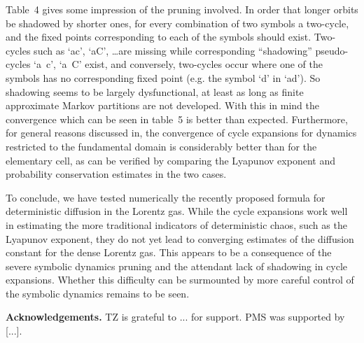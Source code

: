 \documentclass[pre,twocolumn,groupedaddress,showpacs,showkeys]{revtex4}
\begin{document}
Table~4 gives some impression of the pruning involved.
In order that longer orbits be shadowed by shorter ones,
for every combination of two symbols a two-cycle,
and the fixed points corresponding to each of the symbols should exist.
Two-cycles such as `ac', `aC', \ldots are missing while
corresponding ``shadowing'' pseudo-cycles `a~c', `a~C' exist, and
conversely, two-cycles occur where one of the symbols
has no corresponding fixed point
(e.g. the symbol `d' in `ad'). So shadowing seems to be largely dysfunctional,
at least as long as finite approximate Markov partitions are
not developed.
With this in mind the convergence which can be seen in table~5
is better than expected. Furthermore, for general reasons discussed
in, the convergence of cycle expansions for dynamics
restricted to the fundamental domain is considerably better
than for the elementary cell, as can be verified by comparing
the Lyapunov exponent and probability conservation estimates in
the two cases.


To conclude, we have tested numerically the recently proposed formula
for deterministic diffusion in the Lorentz gas.
While the cycle expansions work well in estimating
the more traditional indicators of deterministic chaos, such as
the Lyapunov exponent, they do not yet lead to converging estimates
of the diffusion constant for the dense Lorentz gas. This appears to
be a consequence of the severe symbolic dynamics pruning and the
attendant lack of shadowing in cycle expansions. Whether this difficulty
can be surmounted by more careful control of the symbolic dynamics
remains to be seen.

{\bf Acknowledgements.}
TZ is grateful to ... for support. PMS was supported by [...].
\end{document}
